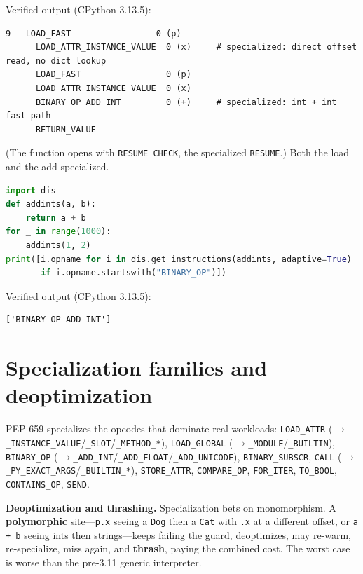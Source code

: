 Verified output (CPython 3.13.5):

\begin{lstlisting}[caption={Output}]
  9   LOAD_FAST                 0 (p)
      LOAD_ATTR_INSTANCE_VALUE  0 (x)     # specialized: direct offset read, no dict lookup
      LOAD_FAST                 0 (p)
      LOAD_ATTR_INSTANCE_VALUE  0 (x)
      BINARY_OP_ADD_INT         0 (+)     # specialized: int + int fast path
      RETURN_VALUE
\end{lstlisting}

(The function opens with \texttt{RESUME\_CHECK}, the specialized \texttt{RESUME}.) Both the load and
the add specialized.

\begin{lstlisting}[language=Python, caption={Confirm the binary-op specialization in isolation.}]
import dis
def addints(a, b):
    return a + b
for _ in range(1000):
    addints(1, 2)
print([i.opname for i in dis.get_instructions(addints, adaptive=True)
       if i.opname.startswith("BINARY_OP")])
\end{lstlisting}

Verified output (CPython 3.13.5):

\begin{lstlisting}[caption={Output}]
['BINARY_OP_ADD_INT']
\end{lstlisting}

\section{Specialization families and deoptimization}

PEP 659 specializes the opcodes that dominate real workloads: \texttt{LOAD\_ATTR}
($\to$\texttt{\_INSTANCE\_VALUE}/\texttt{\_SLOT}/\texttt{\_METHOD\_*}), \texttt{LOAD\_GLOBAL}
($\to$\texttt{\_MODULE}/\texttt{\_BUILTIN}), \texttt{BINARY\_OP}
($\to$\texttt{\_ADD\_INT}/\texttt{\_ADD\_FLOAT}/\texttt{\_ADD\_UNICODE}), \texttt{BINARY\_SUBSCR},
\texttt{CALL} ($\to$\texttt{\_PY\_EXACT\_ARGS}/\texttt{\_BUILTIN\_*}), \texttt{STORE\_ATTR},
\texttt{COMPARE\_OP}, \texttt{FOR\_ITER}, \texttt{TO\_BOOL}, \texttt{CONTAINS\_OP}, \texttt{SEND}.

\textbf{Deoptimization and thrashing.} Specialization bets on monomorphism. A \textbf{polymorphic}
site---\texttt{p.x} seeing a \texttt{Dog} then a \texttt{Cat} with \texttt{.x} at a different offset,
or \texttt{a + b} seeing ints then strings---keeps failing the guard, deoptimizes, may re-warm,
re-specialize, miss again, and \textbf{thrash}, paying the combined cost. The worst case is worse
than the pre-3.11 generic interpreter.

